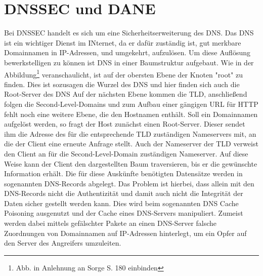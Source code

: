 \chapter{DNSSEC und DANE}
	Bei \ac{DNSSEC} handelt es sich um eine Sicherheitserweiterung des \ac{DNS}.
	Das \ac{DNS} ist ein wichtiger Dienst im INternet, da er dafür zuständig ist, gut merkbare Domainnamen in \ac{IP}-Adressen, und umgekehrt, aufzulösen.
	Um diese Auflösung bewerkstelligen zu können ist \ac{DNS} in einer Baumstruktur aufgebaut. 
	Wie in der Abbildung\footnote{Abb. in Anlehnung an Sorge S. 180 einbinden} veranschaulicht, ist auf der obersten Ebene der Knoten "root" zu finden.
	Dies ist sozusagen die Wurzel des \ac{DNS} und hier finden sich auch die Root-Server des \ac{DNS}
	Auf der nächsten Ebene kommen die \ac{TLD}, anschließend folgen die Second-Level-Domains und zum Aufbau einer gängigen \ac{URL} für \ac{HTTP} fehlt noch eine weitere Ebene, die den Hostnamen enthält.
	Soll ein Domainnamen aufgelöst werden, so fragt der Host zunächst einen Root-Server.
	Dieser sendet ihm die Adresse des für die entsprechende \ac{TLD} zuständigen Nameservers mit, an die der Client eine erneute Anfrage stellt.
	Auch der Nameserver der \ac{TLD} verweist den Client an für die Second-Level-Domain zuständigen Nameserver.
	Auf diese Weise kann der Client den dargestellten Baum traversieren, bis er die gewünschte Information erhält.
	Die für diese Auskünfte benötigten Datensätze werden in sogenannten \ac{DNS}-Records abgelegt.
	Das Problem ist hierbei, dass allein mit den \ac{DNS}-Records nicht die Authentizität und damit auch nicht die Integrität der Daten sicher gestellt werden kann.
	Dies wird beim sogenannten \ac{DNS} Cache Poisoning ausgenutzt und der Cache eines \ac{DNS}-Servers manipuliert.
	Zumeist werden dabei mittels gefälschter Pakete an einen \ac{DNS}-Server falsche Zuordnungen von Domainnamen auf \ac{IP}-Adressen hinterlegt, um ein Opfer auf den Server des Angreifers umzuleiten.